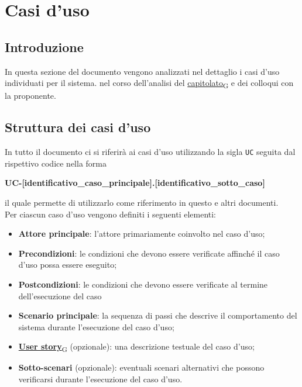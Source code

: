 \section{Casi d'uso}
\subsection{Introduzione}
In questa sezione del documento vengono analizzati nel dettaglio i casi d'uso individuati per il sistema.
nel corso dell'analisi del \href{https://7last.github.io/docs/rtb/documentazione-interna/glossario#capitolato}{capitolato\textsubscript{G}} e dei colloqui con la proponente.

\subsection{Struttura dei casi d'uso}
In tutto il documento ci si riferirà ai casi d'uso utilizzando la sigla \texttt{UC} seguita dal rispettivo codice nella forma
\begin{center}
	\textbf{UC-[identificativo\_caso\_principale].[identificativo\_sotto\_caso]}
\end{center}

il quale permette di utilizzarlo come riferimento in questo e altri documenti.\\
Per ciascun caso d'uso vengono definiti i seguenti elementi:
\begin{itemize}
	\item \textbf{Attore principale}: l'attore primariamente coinvolto nel caso d'uso;
	\item \textbf{Precondizioni}: le condizioni che devono essere verificate affinché il caso d'uso possa essere
	      eseguito;
	\item \textbf{Postcondizioni}: le condizioni che devono essere verificate al termine dell'esecuzione del caso
	\item \textbf{Scenario principale}: la sequenza di passi che descrive il comportamento del sistema durante
	      l'esecuzione del caso d'uso;
	\item \href{https://7last.github.io/docs/rtb/documentazione-interna/glossario#user-story}{\textbf{User story}\textsubscript{G}} (opzionale): una descrizione testuale del caso d'uso;
	\item \textbf{Sotto-scenari} (opzionale): eventuali scenari alternativi che possono verificarsi durante l'esecuzione del
	      caso d'uso.
\end{itemize}


